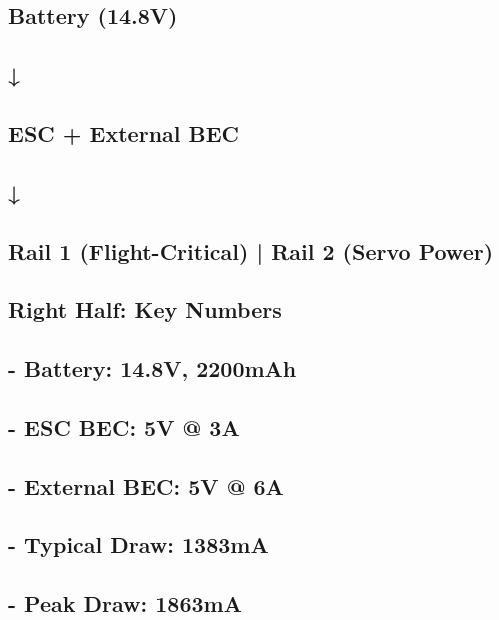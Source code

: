 \documentclass[11pt,letterpaper]{article}
\begin{document}
\subsection*{Battery (14.8V)}

\subsection*{↓}

\subsection*{ESC + External BEC}

\subsection*{↓}

\subsection*{Rail 1 (Flight-Critical) | Rail 2 (Servo Power)}

\subsection*{Right Half: Key Numbers}

\subsection*{- Battery: 14.8V, 2200mAh}

\subsection*{- ESC BEC: 5V @ 3A}

\subsection*{- External BEC: 5V @ 6A}

\subsection*{- Typical Draw: 1383mA}

\subsection*{- Peak Draw: 1863mA}
\end{document}
